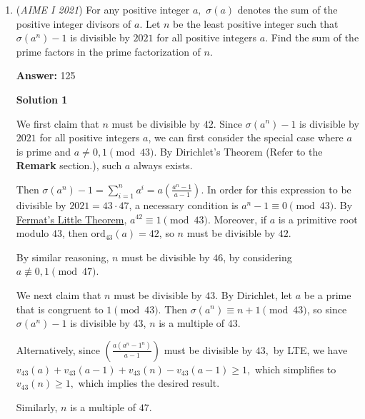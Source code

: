 \begin{enumerate}

 


	\item (\textit{AIME I 2021}) For any positive integer $a,$ $\sigma(a)$ denotes the sum of the positive integer divisors of $a$. Let $n$ be the least positive integer such that $\sigma(a^n)-1$ is divisible by $2021$ for all positive integers $a$. Find the sum of the prime factors in the prime factorization of $n$.


 
 \textbf{Answer: }125



\textbf{Solution 1}

We first claim that $n$ must be divisible by $42$. Since $\sigma(a^n)-1$ is divisible by $2021$ for all positive integers $a$, we can first consider the special case where $a$ is prime and $a \neq 0,1 \pmod{43}$. By Dirichlet's Theorem (Refer to the \textbf{Remark} section.), such $a$ always exists.

 Then $\sigma(a^n)-1 = \sum_{i=1}^n a^i = a\left(\frac{a^n - 1}{a-1}\right)$. In order for this expression to be divisible by $2021=43\cdot 47$, a necessary condition is $a^n - 1 \equiv 0 \pmod{43}$. By \href{https://artofproblemsolving.com/wiki/index.php?title=Fermat\%27s\_Little\_Theorem}{Fermat's Little Theorem}, $a^{42} \equiv 1 \pmod{43}$. Moreover, if $a$ is a primitive root modulo $43$, then $\text{ord}_{43}(a) = 42$, so $n$ must be divisible by $42$.

 By similar reasoning, $n$ must be divisible by $46$, by considering $a \not\equiv 0,1 \pmod{47}$.

 We next claim that $n$ must be divisible by $43$. By Dirichlet, let $a$ be a prime that is congruent to $1 \pmod{43}$. Then $\sigma(a^n) \equiv n+1 \pmod{43}$, so since $\sigma(a^n)-1$ is divisible by $43$, $n$ is a multiple of $43$.

 Alternatively, since $\left(\frac{a(a^n - 1^n)}{a-1}\right)$ must be divisible by $43,$ by LTE, we have $v_{43}(a)+v_{43}{(a-1)}+v_{43}{(n)}-v_{43}{(a-1)} \geq 1,$ which simplifies to $v_{43}(n) \geq 1,$ which implies the desired result.

 Similarly, $n$ is a multiple of $47$.


\end{enumerate}
